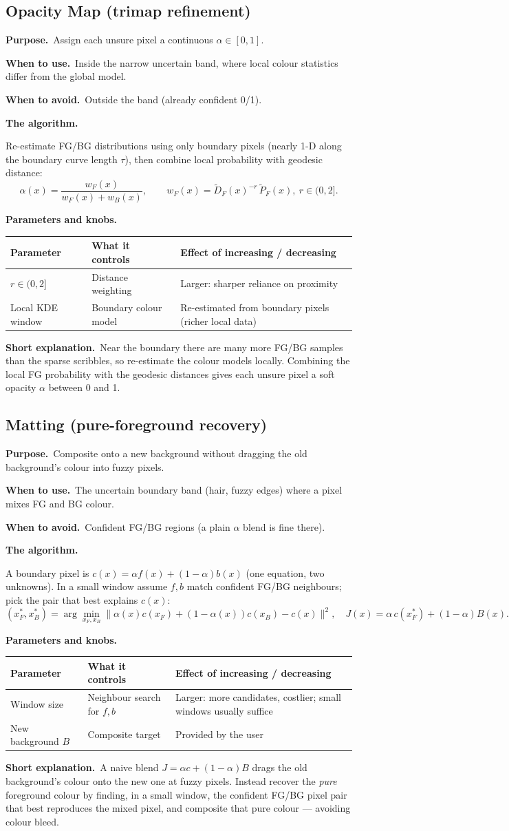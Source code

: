 \documentclass[10pt]{article}
\makeatletter
\newcommand{\Purpose}{\par\smallskip\textbf{Purpose.}\ }
\newcommand{\WhenUse}{\par\textbf{When to use.}\ }
\newcommand{\WhenAvoid}{\par\textbf{When to avoid.}\ }
\newcommand{\TheAlgo}{\par\smallskip\textbf{The algorithm.}\par\nopagebreak}
\newcommand{\Knobs}{\par\smallskip\textbf{Parameters and knobs.}\par\nopagebreak}
\newcommand{\ShortExp}{\par\smallskip\textbf{Short explanation.}\ }
\newenvironment{ptable}{\begin{center}\small\begin{tabular}{@{}p{2.5cm} p{5.9cm} p{6.2cm}@{}}\toprule
Parameter & What it controls & Effect of increasing / decreasing \\ \midrule}
{\bottomrule\end{tabular}\end{center}}
\makeatother
\begin{document}
\subsection{Opacity Map (trimap refinement)}
\Purpose Assign each unsure pixel a continuous $\alpha\in[0,1]$.
\WhenUse Inside the narrow uncertain band, where local colour statistics differ from the global model.
\WhenAvoid Outside the band (already confident 0/1).
\TheAlgo Re-estimate FG/BG distributions using only boundary pixels (nearly 1-D along the boundary curve
length $\tau$), then combine local probability with geodesic distance:
\[
\alpha(x)=\frac{w_F(x)}{w_F(x)+w_B(x)},\qquad w_F(x)=\tilde D_F(x)^{-r}\,\tilde P_F(x),\ r\in(0,2].
\]
\Knobs
\begin{ptable}
$r\in(0,2]$ & Distance weighting & Larger: sharper reliance on proximity \\
Local KDE window & Boundary colour model & Re-estimated from boundary pixels (richer local data) \\
\end{ptable}
\ShortExp Near the boundary there are many more FG/BG samples than the sparse scribbles, so re-estimate the
colour models locally. Combining the local FG probability with the geodesic distances gives each unsure pixel
a soft opacity $\alpha$ between 0 and 1.

\subsection{Matting (pure-foreground recovery)}
\Purpose Composite onto a new background without dragging the old background's colour into fuzzy pixels.
\WhenUse The uncertain boundary band (hair, fuzzy edges) where a pixel mixes FG and BG colour.
\WhenAvoid Confident FG/BG regions (a plain $\alpha$ blend is fine there).
\TheAlgo A boundary pixel is $c(x)=\alpha f(x)+(1-\alpha)b(x)$ (one equation, two unknowns). In a small
window assume $f,b$ match confident FG/BG neighbours; pick the pair that best explains $c(x)$:
\[
(x_F^*,x_B^*)=\arg\min_{x_F,x_B}\|\alpha(x)c(x_F)+(1-\alpha(x))c(x_B)-c(x)\|^2,\quad
J(x)=\alpha\,c(x_F^*)+(1-\alpha)B(x).
\]
\Knobs
\begin{ptable}
Window size & Neighbour search for $f,b$ & Larger: more candidates, costlier; small windows usually suffice \\
New background $B$ & Composite target & Provided by the user \\
\end{ptable}
\ShortExp A naive blend $J=\alpha c+(1-\alpha)B$ drags the old background's colour onto the new one at
fuzzy pixels. Instead recover the \emph{pure} foreground colour by finding, in a small window, the
confident FG/BG pixel pair that best reproduces the mixed pixel, and composite that pure colour ---
avoiding colour bleed.
\end{document}

